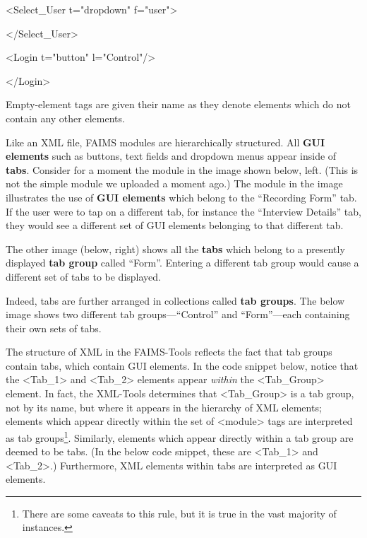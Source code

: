 <Select_User t="dropdown" f="user">

</Select_User>

<Login t="button" l="Control"/>

</Login>

Empty-element tags are given their name as they denote elements which do not contain any other elements.


Like an XML file, FAIMS modules are hierarchically structured. All {\bf GUI elements} such as buttons, text fields and dropdown menus appear inside of {\bf tabs}. Consider for a moment the module in the image shown below, left. (This is not the simple module we uploaded a moment ago.) The module in the image illustrates the use of {\bf GUI elements} which belong to the “Recording Form” tab. If the user were to tap on a different tab, for instance the “Interview Details” tab, they would see a different set of GUI elements belonging to that different tab.

The other image (below, right) shows all the {\bf tabs} which belong to a presently displayed {\bf tab group} called “Form”. Entering a different tab group would cause a different set of tabs to be displayed.

{}{}

Indeed, tabs are further arranged in collections called {\bf tab groups}. The below image shows two different tab groups---“Control” and “Form”---each containing their own sets of tabs.

{}

The structure of XML in the FAIMS-Tools reflects the fact that tab groups contain tabs, which contain GUI elements. In the code snippet below, notice that the <Tab_1> and <Tab_2> elements appear {\em within} the <Tab_Group> element. In fact, the XML-Tools determines that <Tab_Group> is a tab group, not by its name, but where it appears in the hierarchy of XML elements; elements which appear directly within the set of <module> tags are interpreted as tab groups\footnote{There are some caveats to this rule, but it is true in the vast majority of instances.}. Similarly, elements which appear directly within a tab group are deemed to be tabs. (In the below code snippet, these are <Tab_1> and <Tab_2>.) Furthermore, XML elements within tabs are interpreted as GUI elements.

